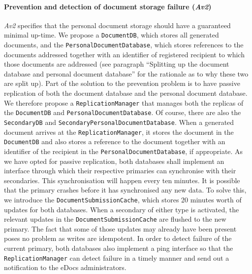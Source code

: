 \documentclass[a4paper,10pt]{article}
\begin{document}
\paragraph{Prevention and detection of document storage failure (\emph{Av2})}
\emph{Av2} specifies that the personal document storage should have a guaranteed minimal up-time. We propose a \texttt{DocumentDB}, which stores all generated documents, and the \texttt{PersonalDocumentDatabase}, which stores references to the documents addressed together with an identifier of registered recipient to which those documents are addressed (see paragraph ``Splitting up the document database and personal document database'' for the rationale as to why these two are split up). Part of the solution to the prevention problem is to have passive replication of both the document database and the personal document database. We therefore propose a \texttt{ReplicationManager} that manages both the replicas of the \texttt{DocumentDB} and \texttt{PersonalDocumentDatabase}. Of course, there are also the \texttt{SecondaryDB} and \texttt{SecondaryPersonalDocumentDatabase}. When a generated document arrives at the \texttt{ReplicationManager}, it stores the document in the \texttt{DocumentDB} and also stores a reference to the document together with an identifier of the recipient in the \texttt{PersonalDocumentDatabase}, if appropriate. As we have opted for passive replication, both databases shall implement an interface through which their respective primaries can synchronise with their secondaries. This synchronisation will happen every ten minutes. It is possible that the primary crashes before it has synchronised any new data. To solve this, we introduce the \texttt{DocumentSubmissionCache}, which stores 20 minutes worth of updates for both databases. When a secondary of either type is activated, the relevant updates in the \texttt{DocumentSubmissionCache} are flushed to the new primary. The fact that some of those updates may already have been present poses no problem as writes are idempotent. In order to detect failure of the current primary, both databases also implement a ping interface so that the \texttt{ReplicationManager} can detect failure in a timely manner and send out a notification to the eDocs administrators.
\end{document}
